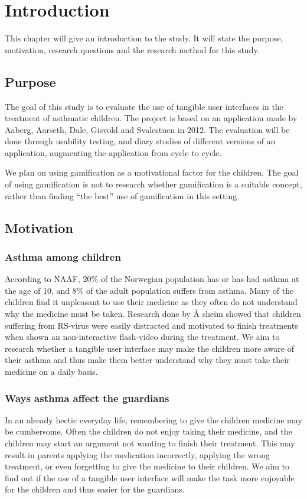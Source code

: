 \chapter{Introduction}
\label{chp:introduction}

This chapter will give an introduction to the study. It will state the purpose, motivation, research questions and the research method for this study. 

\section{Purpose}
\label{sec:purpose}
The goal of this study is to evaluate the use of tangible user interfaces in the treatment of asthmatic children. The project is based on an application made by Aaberg, Aarseth, Dale, Gisvold and Svalestuen \cite{CustomerDriven} in 2012.
The evaluation will be done through usability testing, and diary studies of different versions of an application, augmenting the application from cycle to cycle. 

We plan on using gamification as a motivational factor for the children. The goal of using gamification is not to research whether gamification is a suitable concept, rather than finding ``the best'' use of gamification in this setting.


\section{Motivation}
\label{sec:motivation}

\subsection{Asthma among children}
According to NAAF, 20\% \cite{NAAF} of the Norwegian population has or has had asthma at the age of 10, and 8\% of the adult population suffers from asthma. Many of the children find it unpleasant to use their medicine as they often do not understand why the medicine must be taken. Research done by \r{A} sheim \cite{Asheim610877} showed that children suffering from RS-virus were easily distracted and motivated to finish treatments when shown an non-interactive flash-video during the treatment. We aim to research whether a tangible user interface may make the children more aware of their asthma and thus make them better understand why they must take their medicine on a daily basis. 


\subsection{Ways asthma affect the guardians}
In an already hectic everyday life, remembering to give the children medicine may be cumbersome. Often the children do not enjoy taking their medicine, and the children may start an argument not wanting to finish their treatment. This may result in parents applying the medication incorrectly, applying the wrong treatment, or even forgetting to give the medicine to their children. We aim to find out if the use of a tangible user interface will make the task more enjoyable for the children and thus easier for the guardians. 


